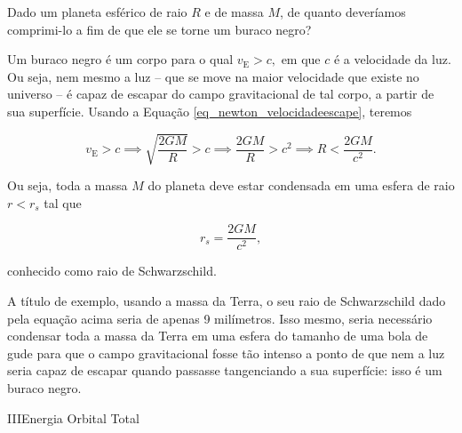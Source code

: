 \begin{exemplo}\label{exemplo_gravitacao_velocidadedeescapeex03}

Dado um planeta esférico de raio $R$ e de massa $M$, de quanto deveríamos comprimi-lo a fim de que ele se torne um buraco negro?


\resolucao

Um buraco negro é um corpo para o qual $v_\text{E} > c,$ em que $c$ é a velocidade da luz. Ou seja, nem mesmo a luz -- que se move na maior velocidade que existe no universo -- é capaz de escapar do campo gravitacional de tal corpo, a partir de sua superfície. Usando a Equação \eqref{eq_newton_velocidadeescape}, teremos

$$ v_\text{E} > c \implies \sqrt{\dfrac{2GM}{R}} > c \implies \dfrac{2GM}{R}> c^2 \implies \boxed{R < \dfrac{2GM}{c^2}.} $$

Ou seja, toda a massa $M$ do planeta deve estar condensada em uma esfera de raio $r<r_s$ tal que 

$$ r_s = \dfrac{2GM}{c^2},$$

\noindent conhecido como raio de Schwarzschild. 



A título de exemplo, usando a massa da Terra, o seu raio de Schwarzschild dado pela equação acima seria de apenas 9 milímetros. Isso mesmo, seria necessário condensar toda a massa da Terra em uma esfera do tamanho de uma bola de gude para que o campo gravitacional fosse tão intenso a ponto de que nem a luz seria capaz de escapar quando passasse tangenciando a sua superfície: isso é um buraco negro.

\end{exemplo}


\vspace{0.3cm}
















\begin{secnivel}{III}{Energia Orbital Total}
 

  
\end{secnivel}


